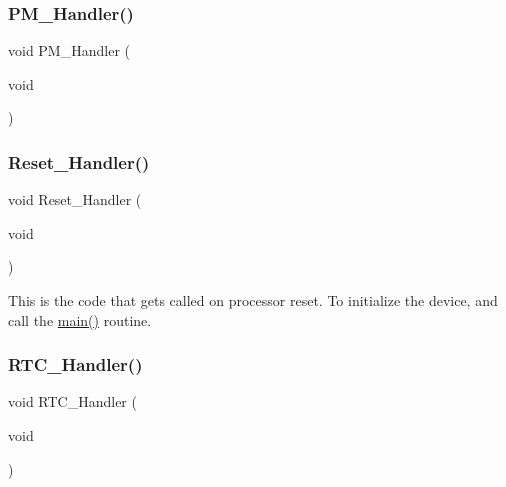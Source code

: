 \mbox{\label{group___s_a_m_d21_g16_l__cmsis_ga29b5a2dea6be2ba182cb272e84629063}} 
\subsubsection{\texorpdfstring{PM\_Handler()}{PM\_Handler()}}
{\footnotesize\ttfamily void P\+M\+\_\+\+Handler (\begin{DoxyParamCaption}\item[{void}]{ }\end{DoxyParamCaption})}

\mbox{\label{group___s_a_m_d21_g16_l__cmsis_gae7ee340978f5c25f52f0cad1457c6616}} 
\subsubsection{\texorpdfstring{Reset\_Handler()}{Reset\_Handler()}}
{\footnotesize\ttfamily void Reset\+\_\+\+Handler (\begin{DoxyParamCaption}\item[{void}]{ }\end{DoxyParamCaption})}



This is the code that gets called on processor reset. To initialize the device, and call the \mbox{\hyperlink{csc__app_8c_a840291bc02cba5474a4cb46a9b9566fe}{main()}} routine. 

\mbox{\label{group___s_a_m_d21_g16_l__cmsis_gab6a8110ba2ed9a12326dc9db531be942}} 
\subsubsection{\texorpdfstring{RTC\_Handler()}{RTC\_Handler()}}
{\footnotesize\ttfamily void R\+T\+C\+\_\+\+Handler (\begin{DoxyParamCaption}\item[{void}]{ }\end{DoxyParamCaption})}

